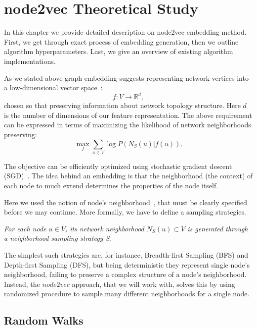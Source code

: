 \chapter{node2vec Theoretical Study}\label{chap:1}
In this chapter we provide detailed description on node2vec embedding method. First, we get through exact process of embedding generation, then we outline algorithm hyperparameters. Last, we give an overview of existing algorithm implementations.

As we stated above graph embedding suggests representing network vertices into a low-dimensional vector space~\cite{cao2015grarep}:
\[
   f: V \rightarrow \mathbb{R}^d,
\]
chosen so that preserving information about network topology structure\cite{fortunato2010community}. Here $d$ is the number of dimensions of our feature representation. The above requirement can be expressed in terms of maximizing the likelihood of network neighborhoods preserving:
\[ 
    \max_f \sum_{u \in V} \log P(N_S(u)|f(u)).
\]

The objective can be efficiently optimized using stochastic gradient descent (SGD)~\cite{recht2011hogwild}.
The idea behind an embedding is that the neighborhood (the context) of each node to much extend determines the properties of the node itself.

Here we used the notion of node's neighborhood~\cite{adamic2003friends}, that must be clearly specified before we may continue. More formally, we have to define a sampling strategies. 

\textit{For each node $u \in V$, its network neighborhood $N_S (u) \subset V$ is generated through a neighborhood sampling strategy $S$.}

The simplest such strategies are, for instance, Breadth-first Sampling (BFS) and Depth-first Sampling (DFS), but being deterministic they represent single node's neighborhood, failing to preserve a complex structure of a node's neighborhood. Instead, the $node2vec$ approach, that we will work with, solves this by using randomized procedure to sample many different neighborhoods for a single node.

\section{Random Walks}

